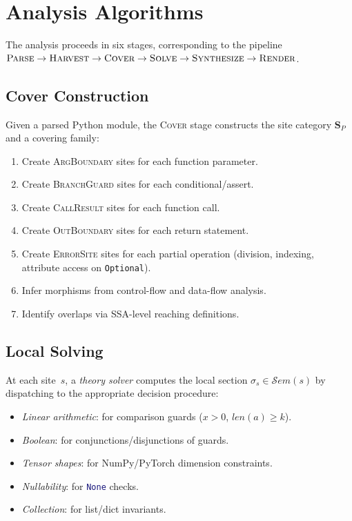 \documentclass[acmsmall,screen]{acmart}
\theoremstyle{remark}
\newcommand{\Sem}{\mathcal{S}\mathit{em}}
\newcommand{\py}[1]{\lstinline[language=Python]{#1}}
\begin{document}
\section{Analysis Algorithms}\label{sec:algorithms}

The analysis proceeds in six stages, corresponding to the pipeline
$\textsc{Parse} \to \textsc{Harvest} \to \textsc{Cover} \to
\textsc{Solve} \to \textsc{Synthesize} \to \textsc{Render}$.

\subsection{Cover Construction}\label{sec:cover-construction}

Given a parsed Python module, the \textsc{Cover} stage constructs the
site category $\mathbf{S}_P$ and a covering family:

\begin{enumerate}[nosep]
  \item Create \textsc{ArgBoundary} sites for each function parameter.
  \item Create \textsc{BranchGuard} sites for each conditional/assert.
  \item Create \textsc{CallResult} sites for each function call.
  \item Create \textsc{OutBoundary} sites for each return statement.
  \item Create \textsc{ErrorSite} sites for each partial operation
    (division, indexing, attribute access on \py{Optional}).
  \item Infer morphisms from control-flow and data-flow analysis.
  \item Identify overlaps via SSA-level reaching definitions.
\end{enumerate}

\subsection{Local Solving}\label{sec:local-solving}

At each site~$s$, a \emph{theory solver} computes the local section
$\sigma_s \in \Sem(s)$ by dispatching to the appropriate decision
procedure:

\begin{itemize}[nosep]
  \item \emph{Linear arithmetic}: for comparison guards
    ($x > 0$, $\mathit{len}(a) \geq k$).
  \item \emph{Boolean}: for conjunctions/disjunctions of guards.
  \item \emph{Tensor shapes}: for NumPy/PyTorch dimension constraints.
  \item \emph{Nullability}: for \py{None} checks.
  \item \emph{Collection}: for list/dict invariants.
\end{itemize}
\end{document}

